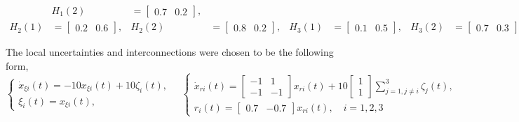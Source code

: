 \documentclass[11pt,draftcls,onecolumn]{IEEEtran}
\begin{document}
\begin{align*}
  & H_1(2)&=\begin{bmatrix}0.7 & 0.2\end{bmatrix},\\
  H_2(1)&=\begin{bmatrix}0.2 & 0.6\end{bmatrix},
  &H_2(2)&=\begin{bmatrix}0.8 &        0.2\end{bmatrix},
 &H_3(1)&=\begin{bmatrix}0.1 &   0.5\end{bmatrix},
 & H_3(2)&=\begin{bmatrix}0.7 &        0.3\end{bmatrix}.
\end{align*}



The local uncertainties and interconnections were chosen to be the following form,
\begin{equation}
\left\{
\begin{array}{ll}
\dot{x}_{\xi i}(t)=-10 x_{\xi i}(t)+10\zeta_i(t),\\
\xi_i(t)=x_{\xi i}(t),
\end{array}
\right.\quad
\left\{
\begin{array}{ll}
\dot{x}_{r i}(t)=\begin{bmatrix}
-1 & 1\\
-1 & -1
\end{bmatrix} x_{r i}(t)+10\begin{bmatrix}
1\\1
\end{bmatrix}\sum_{j=1,j\neq i}^3\zeta_j(t),\\
r_i(t)=\begin{bmatrix}
0.7 &-0.7
\end{bmatrix}x_{r i}(t), \quad i=1,2,3
\end{array}
\right.
\end{equation}
\end{document}
